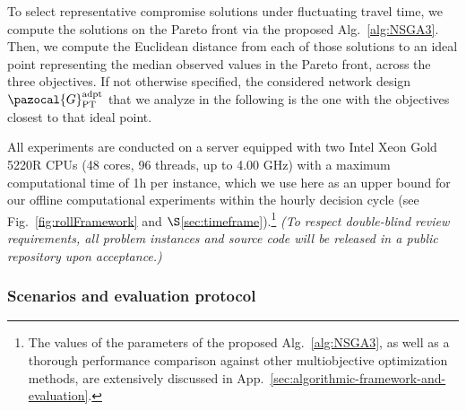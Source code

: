 \documentclass[a4paper,fleqn]{cas-sc}
\begin{document}
To select representative compromise solutions under fluctuating travel time, we compute the solutions on the Pareto front via the proposed Alg.~\ref{alg:NSGA3}. 
Then, we compute the Euclidean distance from each of those solutions to an ideal point representing the median observed values in the Pareto front, across the three objectives. If not otherwise specified, the considered network design $\pazocal{G}_{\text{PT}}^{\text{adpt}}$ that we analyze in the following is the one with the objectives closest to that ideal point. 

All experiments are conducted on a server equipped with two Intel Xeon Gold 5220R CPUs (48 cores, 96 threads, up to 4.00 GHz) with a maximum computational time of 1h per instance, which we use here as an upper bound for our offline computational experiments within the hourly decision cycle (see Fig.~\ref{fig:rollFramework} and $\S$\ref{sec:timeframe}).\footnote{The values of the parameters of the proposed Alg.~\ref{alg:NSGA3}, as well as a thorough performance comparison against other multiobjective optimization methods, are extensively discussed in App.~\ref{sec:algorithmic-framework-and-evaluation}.}
%
\textit{(To respect double-blind review requirements, all problem instances and source code will be released in a public repository upon acceptance.)}




\subsubsection{Scenarios and evaluation protocol}
\end{document}
